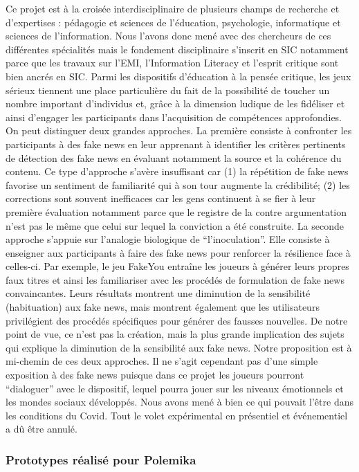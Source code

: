 \documentclass[
  a4paper,
  DIV=11,
  numbers=noendperiod]{scrreprt}
\begin{document}
Ce projet est à la croisée interdisciplinaire de plusieurs champs de
recherche et d'expertises : pédagogie et sciences de l'éducation,
psychologie, informatique et sciences de l'information. Nous l'avons
donc mené avec des chercheurs de ces différentes spécialités mais le
fondement disciplinaire s'inscrit en SIC notamment parce que les travaux
sur l'EMI, l'Information Literacy et l'esprit critique sont bien ancrés
en SIC. Parmi les dispositifs d'éducation à la pensée critique, les jeux
sérieux tiennent une place particulière du fait de la possibilité de
toucher un nombre important d'individus et, grâce à la dimension ludique
de les fidéliser et ainsi d'engager les participants dans l'acquisition
de compétences approfondies. On peut distinguer deux grandes approches.
La première consiste à confronter les participants à des fake news en
leur apprenant à identifier les critères pertinents de détection des
fake news en évaluant notamment la source et la cohérence du contenu. Ce
type d'approche s'avère insuffisant car (1) la répétition de fake news
favorise un sentiment de familiarité qui à son tour augmente la
crédibilité; (2) les corrections sont souvent inefficaces car les gens
continuent à se fier à leur première évaluation notamment parce que le
registre de la contre argumentation n'est pas le même que celui sur
lequel la conviction a été construite. La seconde approche s'appuie sur
l'analogie biologique de ``l'inoculation''. Elle consiste à enseigner
aux participants à faire des fake news pour renforcer la résilience face
à celles-ci. Par exemple, le jeu FakeYou entraîne les joueurs à générer
leurs propres faux titres et ainsi les familiariser avec les procédés de
formulation de fake news convaincantes. Leurs résultats montrent une
diminution de la sensibilité (habituation) aux fake news, mais montrent
également que les utilisateurs privilégient des procédés spécifiques
pour générer des fausses nouvelles. De notre point de vue, ce n'est pas
la création, mais la plus grande implication des sujets qui explique la
diminution de la sensibilité aux fake news. Notre proposition est à
mi-chemin de ces deux approches. Il ne s'agit cependant pas d'une simple
exposition à des fake news puisque dans ce projet les joueurs pourront
``dialoguer'' avec le dispositif, lequel pourra jouer sur les niveaux
émotionnels et les mondes sociaux développés. Nous avons mené à bien ce
qui pouvait l'être dans les conditions du Covid. Tout le volet
expérimental en présentiel et événementiel a dû être annulé.

\subsubsection{Prototypes réalisé pour
Polemika}\label{prototypes-ruxe9alisuxe9-pour-polemika}
\end{document}
